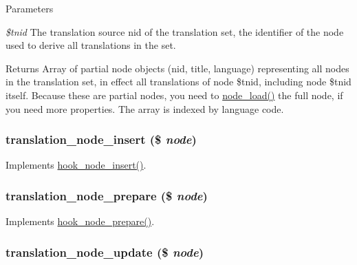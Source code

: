 \begin{DoxyParams}{Parameters}
\item[{\em \$tnid}]The translation source nid of the translation set, the identifier of the node used to derive all translations in the set.\end{DoxyParams}
\begin{DoxyReturn}{Returns}
Array of partial node objects (nid, title, language) representing all nodes in the translation set, in effect all translations of node \$tnid, including node \$tnid itself. Because these are partial nodes, you need to \hyperlink{node_8module_a492ddfc12843e71242bb484a44e51a19}{node\_\-load()} the full node, if you need more properties. The array is indexed by language code. 
\end{DoxyReturn}
\hypertarget{translation_8module_a990ccc695dc79527fcb3b5359e85d591}{
\subsubsection[{translation\_\-node\_\-insert}]{\setlength{\rightskip}{0pt plus 5cm}translation\_\-node\_\-insert (\$ {\em node})}}
\label{translation_8module_a990ccc695dc79527fcb3b5359e85d591}
Implements \hyperlink{group__node__api__hooks_ga8b40dc62e46e5055c205d2a723dc3548}{hook\_\-node\_\-insert()}. \hypertarget{translation_8module_abc386666ed82cbde915c1e990c4184c4}{
\subsubsection[{translation\_\-node\_\-prepare}]{\setlength{\rightskip}{0pt plus 5cm}translation\_\-node\_\-prepare (\$ {\em node})}}
\label{translation_8module_abc386666ed82cbde915c1e990c4184c4}
Implements \hyperlink{group__node__api__hooks_ga4bbe7320bd52fc6183920c8be2d9d4f6}{hook\_\-node\_\-prepare()}. \hypertarget{translation_8module_a37a29aeaa942629df85189e8ce71c6ec}{
\subsubsection[{translation\_\-node\_\-update}]{\setlength{\rightskip}{0pt plus 5cm}translation\_\-node\_\-update (\$ {\em node})}}
